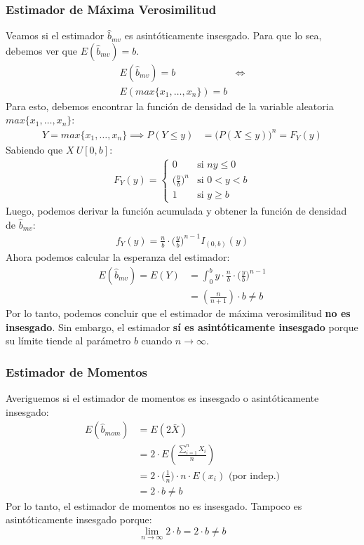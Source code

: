\subsubsection{Estimador de Máxima Verosimilitud}
Veamos si el estimador $\hat{b}_{mv}$ es asintóticamente insesgado. Para que lo sea, debemos ver que $E(\hat{b}_{mv}) = b$.
\begin{align*}
	E(\hat{b}_{mv}) = b &\iff \\
	E(max\{x_1, \dots, x_n\}) = b
\end{align*}
Para esto, debemos encontrar la función de densidad de la variable aleatoria $max\{x_1, \dots, x_n\}$:
\begin{align*}
	Y = max\{x_1, \dots, x_n\} \implies P(Y \leq y) &= \Big( P(X \leq y) \Big)^n = F_{Y}(y)
\end{align*}
Sabiendo que $X~U[0, b]$:
\begin{align*}
	F_{Y}(y) = 
	\begin{cases}
		0 						&\mbox{si } n y \leq 0 \\
		\Big(\frac{y}{b}\Big)^n & \mbox{si } 0 < y < b \\
		1 						& \mbox{si } y \geq b
	\end{cases}
\end{align*}
Luego, podemos derivar la función acumulada y obtener la función de densidad de $\hat{b}_{mv}$:
\begin{align*}
	f_{Y}(y) = \frac{n}{b} \cdot \Big(\frac{y}{b}\Big)^{n - 1} I_{(0, b)}(y)
\end{align*}
Ahora podemos calcular la esperanza del estimador:
\begin{align*}
	E(\hat{b}_{mv}) = E(Y) 	&= \int_{0}^{b}y \cdot \frac{n}{b} \cdot \Big(\frac{y}{b}\Big)^{n - 1} \\
							&= (\frac{n}{n+1}) \cdot b \neq b
\end{align*}
Por lo tanto, podemos concluir que el estimador de máxima verosimilitud \textbf{no es insesgado}. Sin embargo, el estimador \textbf{sí es asintóticamente insesgado} porque su límite tiende al parámetro $b$ cuando $n \rightarrow \infty$.

\subsubsection{Estimador de Momentos}
Averiguemos si el estimador de momentos es insesgado o asintóticamente insesgado:
\begin{align*}
	E(\hat{b}_{mom}) &= E(2\bar{X}) \\
	 	 			 &= 2 \cdot E(\frac{\sum_{i=1}^{n}X_{i}}{n}) \\
	 	 			 &= 2 \cdot \Big(\frac{1}{n}\Big) \cdot n \cdot E(x_{i}) \text{ (por indep.)}\\
	 	 			 &= 2 \cdot b \neq b
\end{align*}
Por lo tanto, el estimador de momentos no es insesgado. Tampoco es asintóticamente insesgado porque:
\begin{displaymath}
\lim_{n \to \infty} 2 \cdot b = 2 \cdot b \neq b
\end{displaymath}

